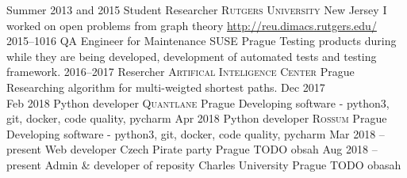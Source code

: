 \cventry
    {Summer 2013 and 2015}
    {Student Researcher}
    {\textsc{Rutgers University}}
    {New Jersey}
    {I worked on open problems from graph theory} 
    {\url{http://reu.dimacs.rutgers.edu/}}
\cventry
    {2015--1016}
    {QA Engineer for Maintenance}
    {\textsc{SUSE}}
    {Prague}
    {}
    {Testing products during while they are being developed, development of automated tests and testing framework.
}
\cventry
    {2016--2017}
    {Resercher}
    {\textsc{Artifical Inteligence Center}}
    {Prague}
    {}
    {}
    {Researching algorithm for multi-weigted shortest paths.}
\cventry
    {Dec 2017 \\ Feb 2018}
    {Python developer}
    {\textsc{Quantlane}}
    {Prague}
    {}
    {Developing software - python3, git, docker, code quality, pycharm}
\cventry
    {Apr 2018}
    {Python developer}
    {\textsc{Rossum}}
    {Prague}
    {}
    {Developing software - python3, git, docker, code quality, pycharm}
\cventry
    {Mar 2018 -- present}
    {Web developer}
    {Czech Pirate party}
    {Prague}
    {}
    {TODO obsah}
\cventry
    {Aug 2018 -- present}
    {Admin \& developer of reposity}
    {Charles University}
    {Prague}
    {}
    {TODO obasah}

